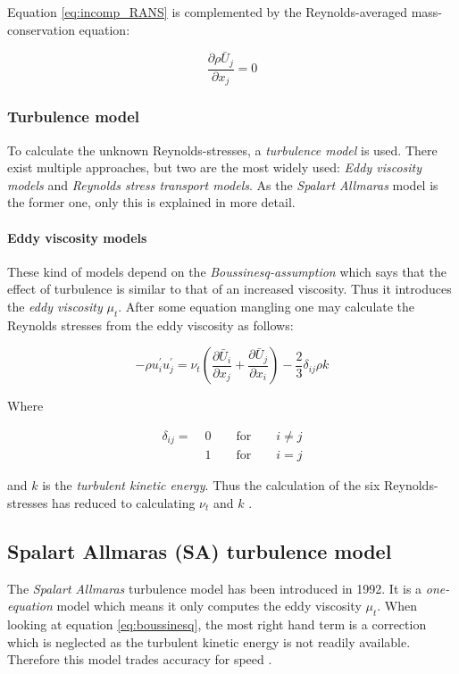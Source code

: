 \noindent Equation \ref{eq:incomp_RANS} is complemented by the Reynolds-averaged
mass-conservation equation:

\begin{equation}
  \frac{\partial \rho \bar U_{j}}{\partial x_{j}} = 0
\end{equation}


\subsubsection{Turbulence model}
To calculate the unknown Reynolds-stresses, a \textit{turbulence model} is used.
There exist multiple approaches, but two are the most widely used: \textit{Eddy
viscosity models} and \textit{Reynolds stress transport models}. As the
\textit{Spalart Allmaras} model is the former one, only this is explained in more
detail.

\paragraph{Eddy viscosity models}
These kind of models depend on the \textit{Boussinesq-assumption} which says
that the effect of turbulence is similar to that of an increased viscosity. Thus
it introduces the \textit{eddy viscosity} $\mu_{t}$. After some equation
mangling one may calculate the Reynolds stresses from the eddy viscosity as
follows:

\begin{equation}
  - \rho u_{i}^{\prime} u_{j}^{\prime} =
  \nu_{t} (\frac{\partial \bar U_{i}}{\partial x_{j}} +
  \frac{\partial \bar U_{j}}{\partial x_{i}}) -
  \frac{2}{3} \delta_{ij} \rho k
  \label{eq:boussinesq}
\end{equation}

\noindent Where

\begin{align*}
  \delta_{ij} = \; &0 \qquad \text{for} \qquad i \neq j \\
                   &1 \qquad \text{for} \qquad i = j
\end{align*}

\noindent and $k$ is the \textit{turbulent kinetic energy}. Thus the calculation
of the six Reynolds-stresses has reduced to calculating $\nu_{t}$ and $k$
\cite{leschziner2015statistical}.


\subsection{Spalart Allmaras (SA) turbulence model}
The \textit{Spalart Allmaras} turbulence model has been introduced in 1992. It
is a \textit{one-equation} model which means it only computes the eddy viscosity
$\mu_{t}$. When looking at equation \ref{eq:boussinesq}, the most right hand
term is a correction which is neglected as the turbulent kinetic energy is not
readily available. Therefore this model trades accuracy for speed
\cite{leschziner2015statistical} \cite{nasatmr}.

